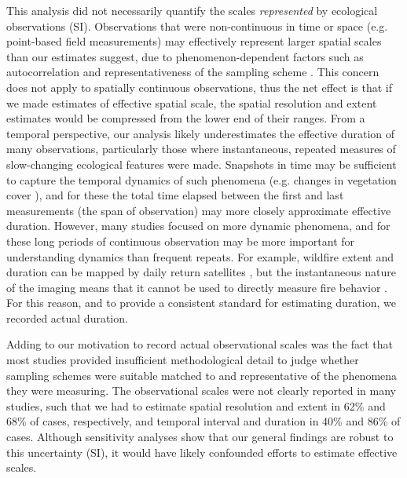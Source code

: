 \documentclass[12pt]{article}
\begin{document}
This analysis did not necessarily quantify the scales \emph{represented} by ecological observations (SI). Observations that were non-continuous in time or space (e.g. point-based field measurements) may effectively represent larger spatial scales than our estimates suggest, due to phenomenon-dependent factors such as autocorrelation and representativeness of the sampling scheme \cite{underwood_experiments_1997, palmer_scale_1994,cao_comparison_2002, legendre_spatial_1993,collins_method_2000-1}. This concern does not apply to spatially continuous observations, thus the net effect is that if we made estimates of effective spatial scale, the spatial resolution and extent estimates would be compressed from the lower end of their ranges. From a temporal perspective, our analysis likely underestimates the effective duration of many observations, particularly those where instantaneous, repeated measures of slow-changing ecological features were made. Snapshots in time may be sufficient to capture the temporal dynamics of such phenomena (e.g. changes in vegetation cover \cite{hansen_high-resolution_2013}), and for these the total time elapsed between the first and last measurements (the span of observation) may more closely approximate effective duration. However, many studies focused on more dynamic phenomena, and for these long periods of continuous observation may be more important for understanding dynamics than frequent repeats. For example, wildfire extent and duration can be mapped by daily return satellites \cite{roy_prototyping_2005,jones_fire_2009}, but the instantaneous nature of the imaging means that it cannot be used to directly measure fire behavior \cite{clements_observing_2007}. For this reason, and to provide a consistent standard for estimating duration, we recorded actual duration. 

Adding to our motivation to record actual observational scales was the fact that most studies provided insufficient methodological detail to judge whether sampling schemes were suitable matched to and representative of the phenomena they were measuring. The observational scales were not clearly reported in many studies, such that we had to estimate spatial resolution and extent in 62\% and 68\% of cases, respectively, and temporal interval and duration in 40\% and 86\% of cases. Although sensitivity analyses show that our general findings are robust to this uncertainty (SI), it would have likely confounded efforts to estimate effective scales. 
\end{document}
